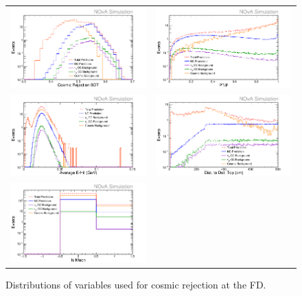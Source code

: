 \begin{figure}[htb]
  \centering
  \begin{tabular}{c c}
    \includegraphics[width=.47\textwidth]{figures/NP1NmCP.png} &
    \includegraphics[width=.47\textwidth]{figures/NP1PPTP.png} \\
    \includegraphics[width=.47\textwidth]{figures/NP1EHit.png} &
    \includegraphics[width=.47\textwidth]{figures/NP1DistTop.png} \\
    \includegraphics[width=.47\textwidth]{figures/NP1IsMu.png} & \\
  \end{tabular}
  \caption[Cosmic Rejection Variable Distributions]{Distributions of variables used for cosmic rejection at the FD.}
  \label{fig:CosRej}
\end{figure}

